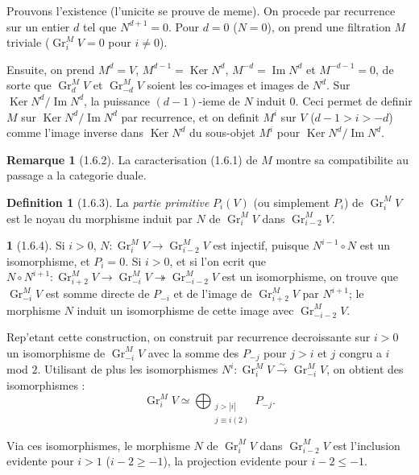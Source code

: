 \documentclass[12pt,a4paper]{article}
\theoremstyle{plain}
\theoremstyle{definition}
\newtheorem{definition}[theorem]{Definition}
\newtheorem{remarque}[theorem]{Remarque}
\theoremstyle{definition}
\newtheorem{para}{}[section]
\theoremstyle{remark}
\DeclareMathOperator{\Gr}{Gr}
\DeclareMathOperator{\Imm}{Im}
\DeclareMathOperator{\Ker}{Ker}
\begin{document}
Prouvons l'existence (l'unicite se prouve de meme). On procede par recurrence sur un entier $d$ tel que $N^{d+1} = 0$. Pour $d = 0$ ($N = 0$), on prend une filtration $M$ triviale ($\Gr_i^M V = 0$ pour $i \neq 0$).

Ensuite, on prend $M^d = V$, $M^{d-1} = \Ker N^d$, $M^{-d} = \Imm N^d$ et $M^{-d-1} = 0$, de sorte que $\Gr_d^M V$ et $\Gr_{-d}^M V$ soient les co-images et images de $N^d$. Sur $\Ker N^d / \Imm N^d$, la puissance $(d-1)$-ieme de $N$ induit $0$. Ceci permet de definir $M$ sur $\Ker N^d / \Imm N^d$ par recurrence, et on definit $M^i$ sur $V$ ($d-1 > i > -d$) comme l'image inverse dans $\Ker N^d$ du sous-objet $M^i$ pour $\Ker N^d / \Imm N^d$.

\begin{remarque}[1.6.2]
La caracterisation (1.6.1) de $M$ montre sa compatibilite au passage a la categorie duale.
\end{remarque}

\begin{definition}[1.6.3]
La \emph{partie primitive} $P_i(V)$ (ou simplement $P_i$) de $\Gr_i^M V$ est le noyau du morphisme induit par $N$ de $\Gr_i^M V$ dans $\Gr_{i-2}^M V$.
\end{definition}

\begin{para}[1.6.4]
Si $i > 0$, $N: \Gr_i^M V \to \Gr_{i-2}^M V$ est injectif, puisque $N^{i-1} \circ N$ est un isomorphisme, et $P_i = 0$. Si $i > 0$, et si l'on ecrit que $N \circ N^{i+1}: \Gr_{i+2}^M V \to \Gr_{-i}^M V \twoheadrightarrow \Gr_{-i-2}^M V$ est un isomorphisme, on trouve que $\Gr_{-i}^M V$ est somme directe de $P_{-i}$ et de l'image de $\Gr_{i+2}^M V$ par $N^{i+1}$; le morphisme $N$ induit un isomorphisme de cette image avec $\Gr_{-i-2}^M V$.

Rep'etant cette construction, on construit par recurrence decroissante sur $i > 0$ un isomorphisme de $\Gr_{-i}^M V$ avec la somme des $P_{-j}$ pour $j > i$ et $j$ congru a $i$ mod $2$. Utilisant de plus les isomorphismes $N^i: \Gr_i^M V \xrightarrow{\sim} \Gr_{-i}^M V$, on obtient des isomorphismes :
\begin{equation}\tag{1.6.4.1}
\Gr_i^M V \simeq \bigoplus_{\substack{j > |i| \\ j \equiv i (2)}} P_{-j}.
\end{equation}
\end{para}

Via ces isomorphismes, le morphisme $N$ de $\Gr_i^M V$ dans $\Gr_{i-2}^M V$ est l'inclusion evidente pour $i > 1$ ($i-2 \geq -1$), la projection evidente pour $i - 2 \leq -1$.
\end{document}

